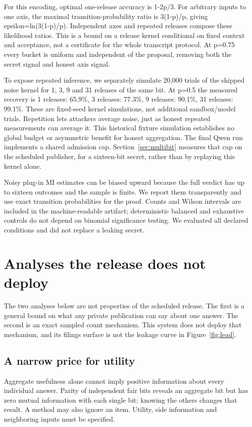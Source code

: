 \documentclass[10pt,twocolumn]{article}
\begin{document}
For this encoding, optimal one-release accuracy is 1-2p/3. For arbitrary inputs to one axis, the maximal transition-probability ratio is 3(1-p)/p, giving epsilon=ln(3(1-p)/p). Independent axes and repeated releases compose these likelihood ratios. This is a bound on a release kernel conditional on fixed context and acceptance, not a certificate for the whole transcript protocol. At p=0.75 every bucket is uniform and independent of the proposal, removing both the secret signal and honest axis signal.


To expose repeated inference, we separately simulate 20,000 trials of the shipped noise kernel for 1, 3, 9 and 31 releases of the same bit. At p=0.5 the measured recovery is 1 releases: 65.9\%, 3 releases: 77.3\%, 9 releases: 90.1\%, 31 releases: 99.1\%. These are fixed-seed kernel simulations, not additional sandbox/model trials. Repetition lets attackers average noise, just as honest repeated measurements can average it. This historical fixture simulation establishes no global budget or asymmetric benefit for honest aggregation. The final Qwen run implements a shared admission cap. Section~\ref{sec:multibit} measures that cap on the scheduled publisher, for a sixteen-bit secret, rather than by replaying this kernel alone.


Noisy plug-in MI estimates can be biased upward because the full verdict has up to sixteen outcomes and the sample is finite. We report them transparently and use exact transition probabilities for the proof. Counts and Wilson intervals are included in the machine-readable artifact; deterministic balanced and exhaustive controls do not depend on binomial significance testing. We evaluated all declared conditions and did not replace a leaking secret.


\section{Analyses the release does not deploy}
\label{app:count}
The two analyses below are not properties of the scheduled release. The first is a general bound on what any private publication can say about one answer. The second is an exact sampled count mechanism. This system does not deploy that mechanism, and its filings surface is not the leakage curve in Figure~\ref{fig:lead}.

\subsection{A narrow price for utility}
Aggregate usefulness alone cannot imply positive information about every individual answer. Parity of independent fair bits reveals an aggregate bit but has zero mutual information with each single bit; knowing the others changes that result. A method may also ignore an item. Utility, side information and neighboring inputs must be specified.
\end{document}
